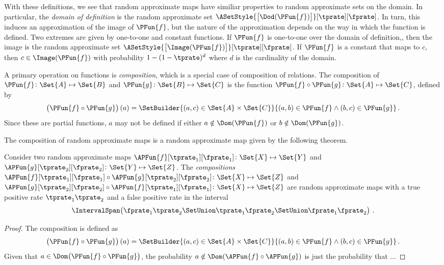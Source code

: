 \documentclass[ ../main.tex]{subfiles}
\begin{document}
With these definitions, we see that random approximate maps have similiar properties to random approximate sets on the domain.
In particular, the \emph{domain of definition} is the random approximate set $\ASetStyle{\left[\Dod(\PFun{f})\right]}[\tprate][\fprate]$.
In turn, this induces an approximation of the image of $\PFun{f}$, but the nature of the approximation depends on the way in which the function is defined.
Two extremes are given by one-to-one and constant functions.
If $\PFun{f}$ is one-to-one over the domain of definition,, then the image is the random approximate set $\ASetStyle{\left[\Image(\PFun{f})\right]}[\tprate][\fprate]$.
If $\PFun{f}$ is a constant that maps to $c$, then $c \in \Image(\PFun{f})$ with probability $1 - (1 - \tprate)^d$ where $d$ is the cardinality of the domain.

A primary operation on functions is \emph{composition}, which is a special case of composition of relations.
The composition of $\PFun{f} \colon \Set{A} \mapsto \Set{B}$ and $\PFun{g} \colon \Set{B} \mapsto \Set{C}$ is the function $\PFun{f} \circ \PFun{g} \colon \Set{A} \mapsto \Set{C}$, defined by
\begin{equation}
\left(\PFun{f} \circ \PFun{g}\right)(a) = \SetBuilder{(a,c) \in \Set{A} \times \Set{C}}{(a,b) \in \PFun{f} \land (b,c) \in \PFun{g}}\,.
\end{equation}
Since these are partial functions, $a$ may not be defined if either $a \notin \Dom(\PFun{f})$ or $b \notin \Dom(\PFun{g})$.

The composition of random approximate maps is a random approximate map given by the following theorem.
\begin{theorem}
	Consider two random approximate maps $\APFun{f}[\tprate_1][\fprate_1] \colon \Set{X} \mapsto \Set{Y}$ and $\APFun{g}[\tprate_2][\fprate_2] \colon \Set{Y} \mapsto \Set{Z}$.
	The \emph{compositions} $\APFun{f}[\tprate_1][\fprate_1] \circ \APFun{g}[\tprate_2][\fprate_2] \colon \Set{X} \mapsto \Set{Z}$ and $\APFun{g}[\tprate_2][\fprate_2] \circ \APFun{f}[\tprate_1][\fprate_1] \colon \Set{X} \mapsto \Set{Z}$ are random approximate maps with a true positive rate $\tprate_1 \tprate_2$ and a false positive rate in the interval
	\begin{equation}
	\IntervalSpan\!\left(\fprate_1 \tprate_2 \SetUnion \tprate_1 \fprate_2 \SetUnion \fprate_1 \fprate_2\right)\,.
	\end{equation}
\end{theorem}
\begin{proof}
	The composition is defined as
	\begin{equation}
	\left(\PFun{f} \circ \PFun{g}\right)(a) = \SetBuilder{(a,c) \in \Set{A} \times \Set{C}}{(a,b) \in \PFun{f} \land (b,c) \in \PFun{g}}\,.
	\end{equation}
	Given that $a \in \Dom\!\left(\PFun{f} \circ \PFun{g}\right)$, the probability $a \notin \Dom(\APFun{f} \circ \APFun{g})$ is just the probability that  ...
\end{proof}
\end{document}
